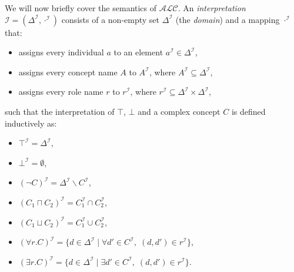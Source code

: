 We will now briefly cover the semantics of $\mathcal{ALC}$. An \emph{interpretation} $\mathcal{I} = (\Delta^{\mathcal{I}}, \cdot^{\mathcal{I}})$ consists of a non-empty set $\Delta^{\mathcal{I}}$ (the \emph{domain}) and a mapping $\cdot^{\mathcal{I}}$ that:
\begin{itemize}
    \item assigns every individual $a$ to an element $a^{\mathcal{I}}\in \Delta^{\mathcal{I}}$,
    \item assigns every concept name $A$ to $A^{\mathcal{I}}$, where $A^{\mathcal{I}}\subseteq \Delta^{\mathcal{I}}$,
    \item assigns every role name $r$ to  $r^{\mathcal{I}}$, where $r^{\mathcal{I}}\subseteq \Delta^{\mathcal{I}}\times \Delta^{\mathcal{I}}$,
\end{itemize}

such that the interpretation of $\top$, $\bot$ and a complex concept $C$ is defined inductively as:
\begin{itemize}
    \item $ \top^{\mathcal{I}} = \Delta^{\mathcal{I}} $,
    \item $ \bot^{\mathcal{I}} = \emptyset $,
    \item $(\neg C)^{\mathcal{I}} = \Delta^{\mathcal{I}} \backslash C^{\mathcal{I}} $,
    \item $ (C_{1} \sqcap C_{2})^{\mathcal{I}} = C_{1}^{\mathcal{I}} \cap C_{2}^{\mathcal{I}} $,
    \item $ (C_{1} \sqcup C_{2})^{\mathcal{I}} = C_{1}^{\mathcal{I}} \cup C_{2}^{\mathcal{I}} $,
    \item $ (\forall r.C)^{\mathcal{I}} = \{d\in \Delta ^{\mathcal{I}}\;|\; \forall d' \in C^{\mathcal{I}}, \; (d,d')\in r^{\mathcal{I}}\} $, 
    \item $ (\exists r.C)^{\mathcal{I}} = \{d\in \Delta ^{\mathcal{I}}\;|\; \exists d' \in C^{\mathcal{I}}, \; (d,d')\in r^{\mathcal{I}}\} $.
\end{itemize}


